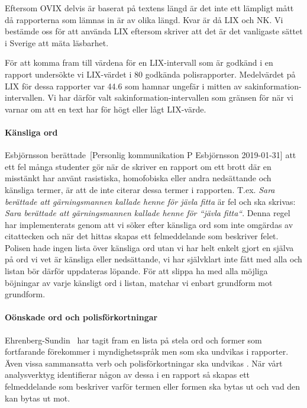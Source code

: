 \documentclass[swedish]{maucsthesis}
\begin{document}
Eftersom OVIX delvis är baserat på textens längd är det inte ett lämpligt mått då
rapporterna som lämnas in är av olika längd. Kvar är då LIX och NK. Vi bestämde
oss för att använda LIX eftersom \cite{abrahamsson:2011} skriver att det är det
vanligaste sättet i Sverige att mäta läsbarhet.

För att komma fram till värdena för en LIX-intervall som är godkänd i en rapport
undersökte vi LIX-värdet i 80 godkända polisrapporter. Medelvärdet på LIX för
dessa rapporter var 44.6 som hamnar ungefär i mitten av sakinformation-intervallen. Vi har därför valt sakinformation-intervallen som gränsen för när
vi varnar om att en text har för högt eller lågt LIX-värde.

\paragraph*{Känsliga ord}

Esbjörnsson berättade~[Personlig kommunikation P Esbjörnsson 2019-01-31] att
ett fel många studenter gör när de skriver en rapport om ett brott där en misstänkt
har använt rasistiska, homofobiska eller andra nedsättande och känsliga termer, är att 
de inte citerar dessa termer i rapporten. T.ex. \textit{Sara berättade att gärningsmannen kallade henne för jävla fitta} är fel och ska skrivas: \textit{Sara berättade att gärningsmannen kallade henne för ``jävla fitta``}. Denna regel har implementerats
genom att vi söker efter känsliga ord som inte omgärdas av citattecken och när det hittas skapas ett felmeddelande som beskriver felet.
Polisen hade ingen lista över känsliga ord utan vi har helt enkelt gjort en själva
på ord vi vet är känsliga eller nedsättande, vi har självklart inte fått med alla 
och listan bör därför uppdateras löpande. För att slippa ha med alla möjliga böjningar
av varje känsligt ord i listan, matchar vi enbart grundform mot grundform.

\paragraph*{Oönskade ord och polisförkortningar}

Ehrenberg-Sundin~\cite{sundin:1992} har tagit fram en lista på stela ord och former som 
fortfarande förekommer i myndighetsspråk men som ska undvikas i rapporter. 
Även vissa sammansatta verb och polisförkortningar ska undvikas \cite{rfsip}.
När vårt analysverktyg identifierar någon av dessa i en rapport så skapas ett felmeddelande
som beskriver varför termen eller formen ska bytas ut och vad den kan bytas ut mot.
\end{document}
